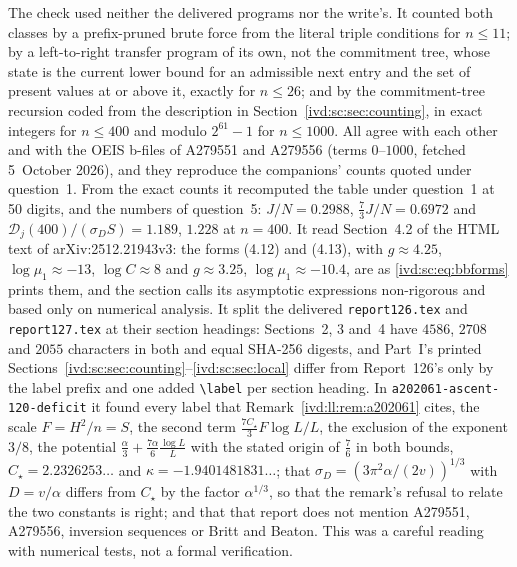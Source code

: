 \documentclass[11pt,letterpaper]{article}
\theoremstyle{remark}\newtheorem{remark}[theorem]{Remark}
\numberwithin{equation}{section}
\newcommand{\file}[1]{\nolinkurl{#1}}
\newcommand{\Dfc}{\mathcal D}
\begin{document}
The check used neither the delivered programs nor the write's. It counted both classes by a prefix-pruned brute force from the literal triple conditions for $n\le11$; by a left-to-right transfer program of its own, not the commitment tree, whose state is the current lower bound for an admissible next entry and the set of present values at or above it, exactly for $n\le26$; and by the commitment-tree recursion coded from the description in Section~\ref{ivd:sc:sec:counting}, in exact integers for $n\le400$ and modulo $2^{61}-1$ for $n\le1000$. All agree with each other and with the OEIS b-files of A279551 and A279556 (terms $0$--$1000$, fetched 5~October 2026), and they reproduce the companions' counts quoted under question~1. From the exact counts it recomputed the table under question~1 at 50 digits, and the numbers of question~5: $J/N=0.2988$, $\frac73J/N=0.6972$ and $\Dfc_j(400)/(\sigma_DS)=1.189$, $1.228$ at $n=400$. It read Section~4.2 of the HTML text of arXiv:2512.21943v3: the forms (4.12) and (4.13), with $g\approx4.25$, $\log\mu_1\approx-13$, $\log C\approx8$ and $g\approx3.25$, $\log\mu_1\approx-10.4$, are as \eqref{ivd:sc:eq:bbforms} prints them, and the section calls its asymptotic expressions non-rigorous and based only on numerical analysis. It split the delivered \file{report126.tex} and \file{report127.tex} at their section headings: Sections~2, 3 and~4 have $4586$, $2708$ and $2055$ characters in both and equal SHA-256 digests, and Part~I's printed Sections~\ref{ivd:sc:sec:counting}--\ref{ivd:sc:sec:local} differ from Report~126's only by the label prefix and one added \verb|\label| per section heading. In \file{a202061-ascent-120-deficit} it found every label that Remark~\ref{ivd:ll:rem:a202061} cites, the scale $F=H^2/n=S$, the second term $\frac{7C_\star}3F\log L/L$, the exclusion of the exponent $3/8$, the potential $\frac\alpha3+\frac{7\alpha}6\frac{\log L}L$ with the stated origin of $\frac76$ in both bounds, $C_\star=2.2326253\ldots$ and $\kappa=-1.9401481831\ldots$; that $\sigma_D=(3\pi^2\alpha/(2v))^{1/3}$ with $D=v/\alpha$ differs from $C_\star$ by the factor $\alpha^{1/3}$, so that the remark's refusal to relate the two constants is right; and that that report does not mention A279551, A279556, inversion sequences or Britt and Beaton. This was a careful reading with numerical tests, not a formal verification.
\end{document}
